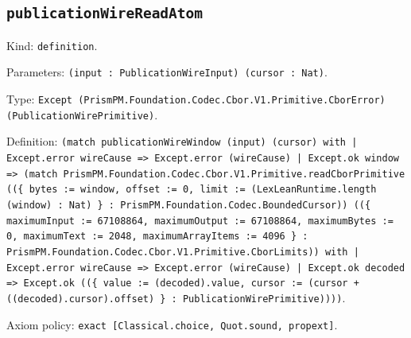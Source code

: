 \documentclass[11pt]{article}
\begin{document}
\subsection*{\texttt{publicationWireReadAtom}}
\noindent Kind: \texttt{definition}.\par
\noindent Parameters: \texttt{(input : PublicationWireInput) (cursor : Nat)}.\par
\noindent Type: \texttt{Except (PrismPM.Foundation.Codec.Cbor.V1.Primitive.CborError) (PublicationWirePrimitive)}.\par
\noindent Definition: \texttt{(match publicationWireWindow (input) (cursor) with | Except.error wireCause => Except.error (wireCause) | Except.ok window => (match PrismPM.Foundation.Codec.Cbor.V1.Primitive.readCborPrimitive ((\{ bytes := window, offset := 0, limit := (LexLeanRuntime.length (window) : Nat) \} : PrismPM.Foundation.Codec.BoundedCursor)) ((\{ maximumInput := 67108864, maximumOutput := 67108864, maximumBytes := 0, maximumText := 2048, maximumArrayItems := 4096 \} : PrismPM.Foundation.Codec.Cbor.V1.Primitive.CborLimits)) with | Except.error wireCause => Except.error (wireCause) | Except.ok decoded => Except.ok ((\{ value := (decoded).value, cursor := (cursor + ((decoded).cursor).offset) \} : PublicationWirePrimitive))))}.\par
\noindent Axiom policy: \texttt{exact [Classical.choice, Quot.sound, propext]}.\par
\end{document}
